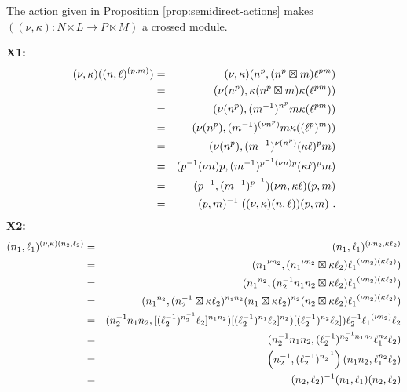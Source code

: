 \begin{lem}
The action given in Proposition \ref{prop:semidirect-actions} makes 
$( (\nu,\kappa) : N \ltimes L \to P \ltimes M)$ a crossed module.
\end{lem}
\begin{pf}
{\bf X1:}
\vspace{-5mm}
\begin{eqnarray*}
(\nu,\kappa)((n, \ell)^{(p,m)}) 
  & = & (\nu,\kappa)(n^p, (n^p \boxtimes m)\ell^{pm}) \\
  & = & (\nu(n^p), \kappa(n^p \boxtimes m) \kappa(\ell^{pm})) \\
  & = & (\nu(n^p), (m^{-1})^{n^p} m \kappa(\ell^{pm})) \\
  & = & (\nu(n^p), (m^{-1})^{(\nu n^p)} m \kappa((\ell^p)^m)) \\
  & = & (\nu(n^p), (m^{-1})^{\nu (n^p)} (\kappa \ell)^p m) \\
  & = & (p^{-1}(\nu n)p, (m^{-1})^{p^{-1}(\nu n)p} (\kappa \ell)^p m) \\
  & = & (p^{-1}, (m^{-1})^{p^{-1}}) (\nu n, \kappa \ell) (p,m) \\
  & = & (p,m)^{-1}\;((\nu,\kappa)(n,\ell)) (p,m)~.
\end{eqnarray*}
{\bf X2:}
\begin{eqnarray*}
(n_1, \ell_1)^{(\nu,\kappa)(n_2, \ell_2)} 
  & = & (n_1, \ell_1)^{(\nu n_2, \kappa \ell_2)} \\
  & = & ({n_1}^{\nu n_2}, ({n_1}^{\nu n_2} \boxtimes \kappa\ell_2) 
          {\ell_1}^{(\nu n_2)(\kappa \ell_2)}) \\
  & = & ({n_1}^{n_2}, (n_2^{-1}n_1n_2 \boxtimes \kappa \ell_2)
          {\ell_1}^{(\nu n_2)(\kappa \ell_2)}) \\
  & = & ({n_1}^{n_2}, (n_2^{-1} \boxtimes \kappa \ell_2)^{n_1n_2}
          (n_1 \boxtimes \kappa \ell_2)^{n_2} (n_2 \boxtimes \kappa \ell_2)
          {\ell_1}^{(\nu n_2)(\kappa \ell_2)}) \\
  & = & (n_2^{-1}n_1n_2, [(\ell_2^{-1})^{n_2^{-1}}\ell_2]^{n_1n_2})
          [(\ell_2^{-1})^{n_1}\ell_2]^{n_2})  
          [(\ell_2^{-1})^{n_2}\ell_2]) 
          \ell_2^{-1}{\ell_1}^{(\nu n_2)}\ell_2 \\
  & = & (n_2^{-1}n_1n_2, (\ell_2^{-1})^{n_2^{-1}n_1n_2} \ell_1^{n_2} \ell_2) \\
  & = & \left(n_2^{-1}, (\ell_2^{-1})^{n_2^{-1}}\right) 
          (n_1n_2, \ell_1^{n_2}\ell_2) \\ 
  & = & (n_2, \ell_2)^{-1}(n_1, \ell_1)(n_2, \ell_2) 
\end{eqnarray*} 
\end{pf}

